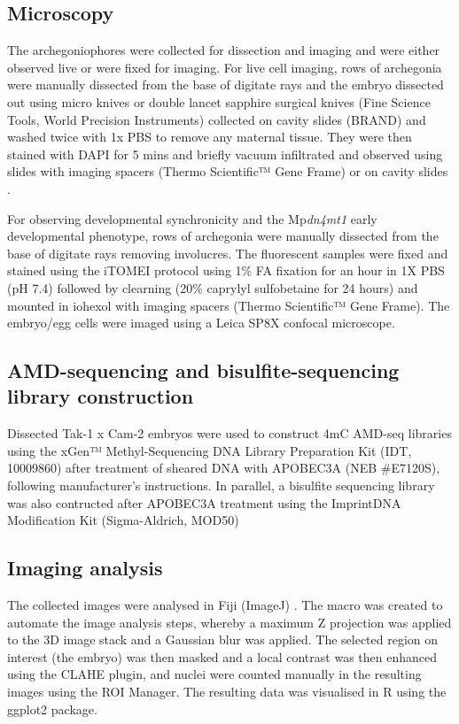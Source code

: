 \subsection{Microscopy} 

The archegoniophores were collected for dissection and imaging and were either observed live or were fixed for imaging. For live cell imaging, rows of archegonia were manually dissected from the base of digitate rays and the embryo dissected out using micro knives or double lancet sapphire surgical knives (Fine Science Tools, World Precision Instruments) collected on cavity slides (BRAND\textregistered) and washed twice with 1x PBS to remove any maternal tissue. They were then stained with DAPI for 5 mins and briefly vacuum infiltrated and observed using slides with imaging spacers (Thermo Scientific™ Gene Frame) or on cavity slides \cite{RN139}. 

For observing developmental synchronicity and the Mp\textit{dn4mt1} early developmental phenotype,  rows of archegonia were manually dissected from the base of digitate rays removing involucres. The fluorescent samples were fixed and stained using the iTOMEI protocol \cite{RN148} using 1\% FA fixation for an hour in 1X PBS (pH 7.4) followed by clearning (20\% caprylyl sulfobetaine for 24 hours) and mounted in iohexol with imaging spacers (Thermo Scientific™ Gene Frame). The embryo/egg cells were imaged using a Leica SP8X confocal microscope.

\subsection{AMD-sequencing and bisulfite-sequencing library construction}

Dissected Tak-1 x Cam-2 embryos were used to construct 4mC AMD-seq libraries using the xGen™ Methyl-Sequencing DNA Library Preparation Kit (IDT, 10009860) after treatment of sheared DNA with APOBEC3A (NEB \#E7120S), following manufacturer’s instructions. In parallel, a bisulfite sequencing library was also contructed after APOBEC3A treatment using the Imprint\textregistered DNA Modification Kit (Sigma-Aldrich, MOD50)


\subsection{Imaging analysis}

The collected images were analysed in Fiji (ImageJ) \cite{RN266}. The macro was created to automate the image analysis steps, whereby a maximum Z projection was applied to the 3D image stack and a Gaussian blur was applied. The selected region on interest (the embryo) was then masked and a local contrast was then enhanced using the CLAHE plugin, and nuclei were counted manually in the resulting images using the ROI Manager. The resulting data was visualised in R using the ggplot2 package.

